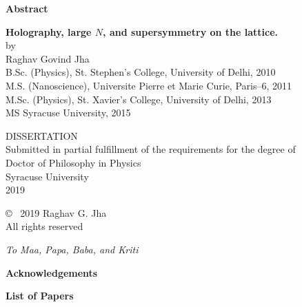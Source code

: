 \newpage

\thispagestyle{empty}
\begin{center}
{\bf\Large Abstract}\\[0.5em]
\end{center}

\begin{quote}
\end{quote}

\newpage
\thispagestyle{empty}

\begin{center}
{\bf\LARGE Holography, large $N$, and supersymmetry on the lattice.}\\
[3em]
 by\\[1em]
{\large Raghav Govind Jha\\[1em]
B.Sc. (Physics), St. Stephen's College, University of Delhi, 2010\\
M.S. (Nanoscience), Universite Pierre et Marie Curie, Paris--6, 2011\\
M.Sc. (Physics), St. Xavier's College, University of Delhi, 2013 \\ 
MS Syracuse University, 2015 \\  [7em]}
\end{center}

\begin{center}
DISSERTATION\\
Submitted in partial fulfillment of the requirements for the degree of\\
Doctor of Philosophy in Physics\\[7em]
Syracuse University\\
{ 2019}\\[5em]

\end{center}

\newpage
\thispagestyle{empty}
\begin{center}
\vspace*{3in}
\copyright ~ 2019 Raghav G. Jha\\[1.5em]
All rights reserved
\end{center}


\newpage
\thispagestyle{empty}
\clearpage
\vspace*{1in}
\begin{center}
{\textit{To Maa, Papa, Baba, and Kriti}} \\
	\vspace{2 cm}
	\vspace{5 cm}
\end{center}
\clearpage

\newpage 




\begin{center}
{\bf\Large Acknowledgements}\\[0.5em]
\end{center}

        

\newpage

\begin{center}
	{\bf\Large List of Papers}
\end{center}


   
\newpage
    \tableofcontents

 
\newpage    \listoffigures
\newpage    \listoftables

\newpage
